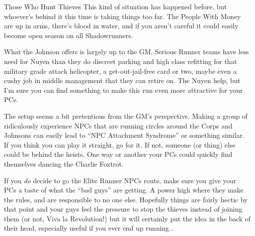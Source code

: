 \begin{scenario}{Those Who Hunt Thieves}
This kind of situation has happened before, but whoever's behind it this time is taking things too far. The People With Money are up in arms, there's blood in water, and if you aren't careful it could easily become open season on all Shadowrunners.

\notes
What the Johnson offers is largely up to the GM. Serious Runner teams have less need for Nuyen than they do discreet parking and high class refitting for that military grade attack helicopter, a get-out-jail-free card or two, maybe even a cushy job in middle management that they can retire on. The Nuyen help, but I'm sure you can find something to make this run even more attractive for your PCs.

The setup seems a bit pretentious from the GM's perspective. Making a group of ridiculously experience NPCs that are running circles around the Corps and Johnsons can easily lead to ``NPC Attachment Syndrome'' or something similar. If you think you can play it straight, go for it. If not, someone (or thing) else could be behind the heists. One way or another your PCs could quickly find themselves dancing the Charlie Foxtrot.

If you \textit{do} decide to go the Elite Runner NPCs route, make sure you give your PCs a taste of what the ``bad guys'' are getting. A power high where they make the rules, and are responsible to no one else. Hopefully things are fairly hectic by that point and your guys feel the pressure to stop the thieves instead of joining them (or not, Viva la Revolution!) but it will certainly put the idea in the back of their head, especially useful if you ever end up running...


\end{scenario}